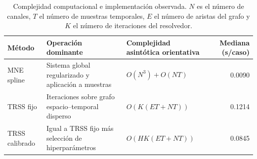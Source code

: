 \begin{table}[htbp]
\centering
\small
\caption{Complejidad computacional e implementación observada. $N$ es el número de canales, $T$ el número de muestras temporales, $E$ el número de aristas del grafo y $K$ el número de iteraciones del resolvedor.}
\label{tab:ch4_runtime_complexity}
\begin{tabular}{@{}p{2.6cm}p{3.9cm}p{3.2cm}r@{}}
\toprule
Método & Operación dominante & Complejidad asintótica orientativa & Mediana (s/caso) \\
\midrule
MNE spline & Sistema global regularizado y aplicación a muestras & $O(N^3) + O(NT)$ & 0.0090 \\
TRSS fijo & Iteraciones sobre grafo espacio--temporal disperso & $O(K(ET + NT))$ & 0.1214 \\
TRSS calibrado & Igual a TRSS fijo más selección de hiperparámetros & $O(HK(ET + NT))$ & 0.0845 \\
\bottomrule
\end{tabular}
\end{table}
